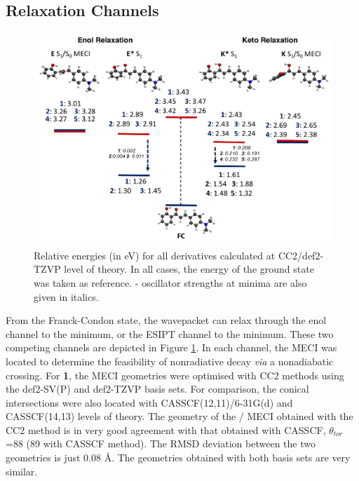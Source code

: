 \subsection{Relaxation Channels}\label{section: NRdecay_Channels}
\begin{figure}
\centering
  \includegraphics[width=0.9\linewidth]{3nonradiativedecay/HC_Energy_Levels.pdf}
  \caption[\textbf{HC} energy levels]{Relative energies (in eV) for all derivatives calculated at CC2/def2-TZVP level of theory. In all cases, the energy of the ground state was taken as reference. \sone{}-\szero{} oscillator strengths at \sone{} minima are also given in italics.}
  \label{figure: HC_Energy_Levels}
\end{figure}
From the Franck-Condon state, the wavepacket can relax through the enol channel to the \Estar{} minimum, or the ESIPT channel to the \Kstar{} minimum. These two competing channels are depicted in Figure \ref{figure: HC_Energy_Levels}. In each channel, the \ac{MECI} was located to determine the feasibility of nonradiative decay \textit{via} a nonadiabatic crossing. For \textbf{1}, the \ac{MECI} geometries were optimised with CC2 methods using the def2-SV(P) and def2-TZVP basis sets. For comparison, the conical intersections were also located with CASSCF(12,11)/6-31G(d) and CASSCF(14,13) levels of theory. The geometry of the \Kstar{} \sone/\szero{} \ac{MECI} obtained with the CC2 method is in very good agreement with that obtained with CASSCF, $\theta_{tor}$=88\textdegree{} (89\textdegree{} with CASSCF method). The RMSD deviation between the two geometries is just 0.08 \AA. The geometries obtained with both basis sets are very similar. 

